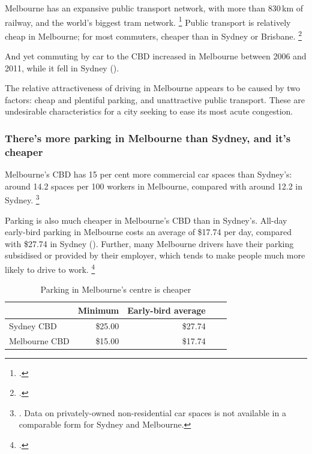 \documentclass{grattan}
\begin{document}
Melbourne has an expansive public transport network, with more than 830\,km of railway, and the world's biggest tram network.%
    \footcite{PTV-website}
Public transport is relatively cheap in Melbourne; for most commuters, cheaper than in Sydney or Brisbane.%
\footcite{2015-Fare-Benchmarking}

And yet commuting by car to the CBD increased in Melbourne between 2006 and 2011, while it fell in Sydney (). 

The relative attractiveness of driving in Melbourne appears to be caused by two factors: cheap and plentiful parking, and unattractive public transport.
These are undesirable characteristics for a city seeking to ease its most acute congestion.\oneraggedpage
\vfill\null





\subsubsection{There's more parking in Melbourne than Sydney, and it's cheaper}

Melbourne's CBD has 15 per cent more commercial car spaces than Sydney's: around 14.2 spaces per 100 workers in Melbourne, compared with around 12.2 in Sydney.%
    \footnote{\textcite{The-evolution-of-car-parking}. Data on privately-owned non-residential car spaces is not available in a comparable form for Sydney and Melbourne.}

Parking is also much cheaper in Melbourne's CBD than in Sydney's.
All-day early-bird parking in Melbourne costs an average of \$17.74 per day, compared with \$27.74 in Sydney ().
Further, many Melbourne drivers have their parking subsidised or provided by their employer, which tends to make people much more likely to drive to work.%
\footcite{Parking-availability-influences-on-travel-mode}

\begin{table}[!h]
\caption{Parking in Melbourne's centre is cheaper\label{tbl:parking-in-Melbourne-CBD-is-cheap}}
\begin{tabularx}{\linewidth}{lRRRR}
\toprule
              & \textbf{Minimum} & \textbf{Early-bird average} \\
\midrule
Sydney CBD    & \$25.00          & \$27.74 \\
Melbourne CBD & \$15.00          & \$17.74 \\
\bottomrule
\end{tabularx}
\end{table}
\end{document}

